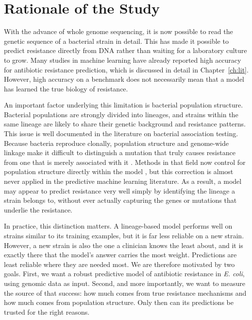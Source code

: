 \section{Rationale of the Study}
With the advance of whole genome sequencing, it is now possible to read the genetic sequence of a bacterial strain in detail. This has made it possible to predict resistance directly from DNA rather than waiting for a laboratory culture to grow. Many studies in machine learning have already reported high accuracy for antibiotic resistance prediction, which is discussed in detail in Chapter~\ref{ch:lit}. However, high accuracy on a benchmark does not necessarily mean that a model has learned the true biology of resistance.

An important factor underlying this limitation is bacterial population structure. Bacterial populations are strongly divided into lineages, and strains within the same lineage are likely to share their genetic background and resistance patterns. This issue is well documented in the literature on bacterial association testing. Because bacteria reproduce clonally, population structure and genome-wide linkage make it difficult to distinguish a mutation that truly causes resistance from one that is merely associated with it \cite{saber2020bacgwas}. Methods in that field now control for population structure directly within the model \cite{lees2020pyseer}, but this correction is almost never applied in the predictive machine learning literature. As a result, a model may appear to predict resistance very well simply by identifying the lineage a strain belongs to, without ever actually capturing the genes or mutations that underlie the resistance.

In practice, this distinction matters. A lineage-based model performs well on strains similar to its training examples, but it is far less reliable on a new strain. However, a new strain is also the one a clinician knows the least about, and it is exactly there that the model's answer carries the most weight. Predictions are least reliable where they are needed most. We are therefore motivated by two goals. First, we want a robust predictive model of antibiotic resistance in \textit{E. coli}, using genomic data as input. Second, and more importantly, we want to measure the source of that success: how much comes from true resistance mechanisms and how much comes from population structure. Only then can its predictions be trusted for the right reasons.


